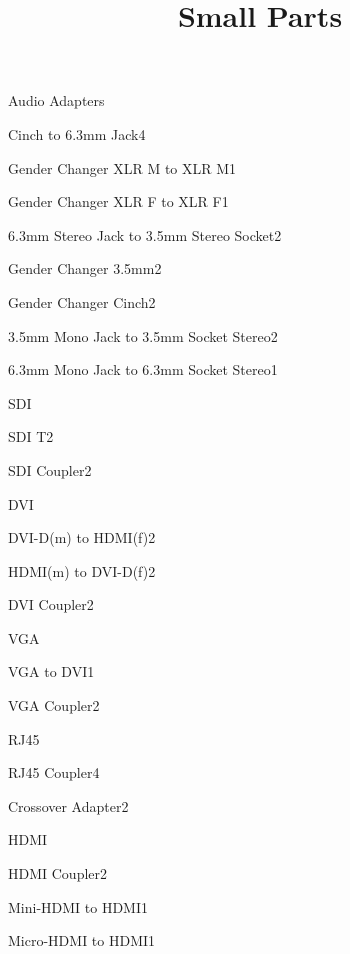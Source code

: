 \def\papersize{5}




\title{Small Parts}

\begin{checklist}{Audio Adapters}
  \item{Cinch to 6.3mm Jack}{4}
  \item{Gender Changer XLR M to XLR M}{1}
  \item{Gender Changer XLR F to XLR F}{1}
  \item{6.3mm Stereo Jack to 3.5mm Stereo Socket}{2}
  \item{Gender Changer 3.5mm}{2}
  \item{Gender Changer Cinch}{2}
  \item{3.5mm Mono Jack to 3.5mm Socket Stereo}{2}
  \item{6.3mm Mono Jack to 6.3mm Socket Stereo}{1}
\end{checklist}

\begin{checklist}{SDI}
  \item{SDI T}{2}
  \item{SDI Coupler}{2}
\end{checklist}

\begin{checklist}{DVI}
  \item{DVI-D(m) to HDMI(f)}{2}
  \item{HDMI(m) to DVI-D(f)}{2}
  \item{DVI Coupler}{2}
\end{checklist}

\begin{checklist}{VGA}
  \item{VGA to DVI}{1}
  \item{VGA Coupler}{2}
\end{checklist}

\begin{checklist}{RJ45}
  \item{RJ45 Coupler}{4}
  \item{Crossover Adapter}{2}
\end{checklist}

\begin{checklist}{HDMI}
  \item{HDMI Coupler}{2}
  \item{Mini-HDMI to HDMI}{1}
  \item{Micro-HDMI to HDMI}{1}
\end{checklist}


